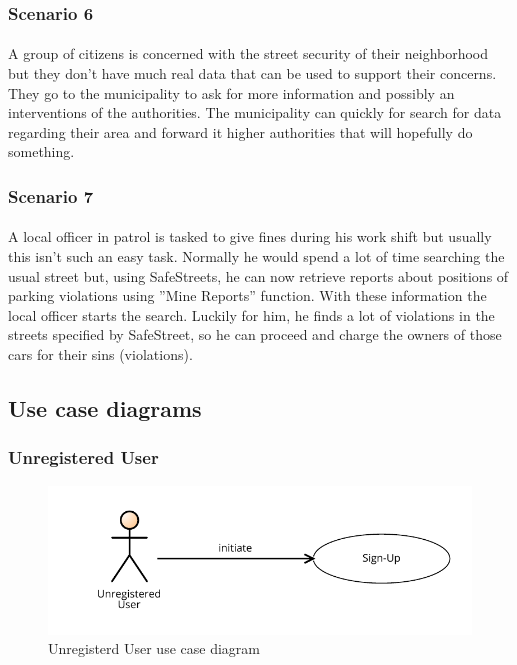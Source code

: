 				\subsubsection{Scenario 6}
					\paragraph{}
						A group of citizens is concerned with the street security of their neighborhood but they don't have much real data that can be used to support their concerns. They go to the municipality to ask for more information and possibly an interventions of the authorities. The municipality can quickly for search for data regarding their area and forward it higher authorities that will hopefully do something.
				\subsubsection{Scenario 7}
					\paragraph{}
						A local officer in patrol is tasked to give fines during his work shift but usually this isn't such an easy task. Normally he would spend a lot of time searching the usual street but, using SafeStreets, he can now retrieve reports about positions of parking violations using ''Mine Reports'' function. With these information the local officer starts the search. Luckily for him, he finds a lot of violations in the streets specified by SafeStreet, so he can proceed and charge the owners of those cars for their sins (violations).
			\clearpage
			\subsection{Use case diagrams}
				\subsubsection{Unregistered User}
					\begin{figure}[!h]
						\centering
						\includegraphics[width=\textwidth]{images/UseCase/UU.pdf}
						\caption{Unregisterd User use case diagram}
					\end{figure}
